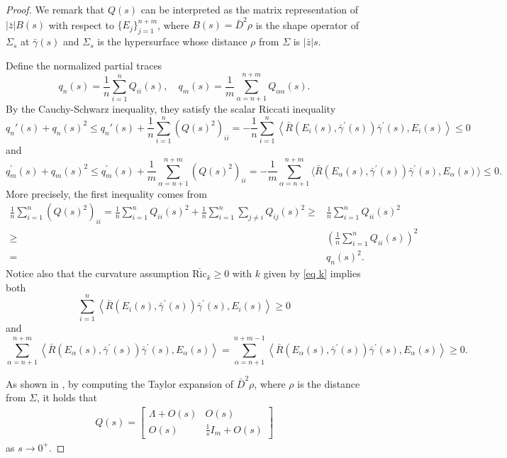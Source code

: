 \documentclass[11pt, reqno]{amsart}
\numberwithin{equation}{section}
\begin{document}
\begin{proof}
We remark that $Q(s)$ can be interpreted as the matrix representation of $|\bar z| B(s)$ with respect to $\{E_j\}_{j=1}^{n+m}$, where $B(s)=\bar D^2 \rho$ is the shape operator of $\Sigma_s$ at $\bar\gamma(s)$ and $\Sigma_s$ is the hypersurface whose distance $\rho$ from $\Sigma$ is $|\bar z|s$.

Define the normalized partial traces
$$
q_n(s)=\frac{1}{n}\sum_{i=1}^n Q_{ii}(s), \quad
q_m(s)=\frac{1}{m}\sum_{\alpha=n+1}^{n+m}Q_{\alpha\alpha}(s).
$$
By the Cauchy-Schwarz inequality, they satisfy the scalar Riccati inequality
$$
q_n'(s)+ q_n(s)^2\le
q_n'(s)+\frac{1}{n}\sum_{i=1}^{n}\left(Q(s)^2\right)_{ii} = -\frac{1}{n}\sum_{i=1}^{n}\left\langle\bar{R}\left(E_i(s), \bar{\gamma}^{\prime}(s)\right) \bar{\gamma}^{\prime}(s), E_i(s)\right\rangle\le0
$$
and
$$
q_m^{\prime}(s)+ q_m(s)^2 \le q_m^{\prime}(s)+\frac{1}{m}\sum_{\alpha =n+1}^{ n+m}(Q(s)^2)_{ii} = -\frac{1}{m}\sum_{\alpha =n+1}^{n+m}\langle
\bar{R}(E_\alpha (s), \bar{\gamma}^{\prime}(s))\bar{\gamma}^{\prime}(s), E_\alpha (s) \rangle \le0.
$$
More precisely, the first inequality comes from
\begin{equation}\label{ineq cs}
\begin{aligned}
\frac{1}{n} \sum_{i=1}^n\left(Q(s)^2\right)_{i i}=\frac{1}{n} \sum_{i=1}^n Q_{i i}(s)^2+\frac{1}{n} \sum_{i=1}^n \sum_{j \ne i} Q_{i j}(s)^2 \ge & \frac{1}{n} \sum_{i=1}^n Q_{i i}(s)^2\\
\ge& \left(\frac{1}{n} \sum_{i=1}^n Q_{i i}(s)\right)^2\\
=& q_n(s)^2.
\end{aligned}
\end{equation}
Notice also that the curvature assumption $\overline{\mathrm{Ric}}_k\ge0$ with $k$ given by \eqref{eq k} implies both
$$\sum_{i=1}^n\left\langle\bar{R}\left(E_i(s), \bar{\gamma}^{\prime}(s)\right) \bar{\gamma}^{\prime}(s), E_i(s)\right\rangle\ge0$$ and
$$\sum_{\alpha=n+1}^{n+m}\left\langle\bar{R}\left(E_\alpha(s), \bar{\gamma}^{\prime}(s)\right) \bar{\gamma}^{\prime}(s), E_\alpha(s)\right\rangle=
\sum_{\alpha=n+1}^{n+m-1}\left\langle\bar{R}\left(E_\alpha(s), \bar{\gamma}^{\prime}(s)\right) \bar{\gamma}^{\prime}(s), E_\alpha(s)\right\rangle\ge0. $$

As shown in \cite[Equation 2.4]{Chahine2019}, by computing the Taylor expansion of $\bar D^2 \rho$, where $\rho$ is the distance from $\Sigma$, it holds that
\begin{align}\label{Q0}
Q(s)=
\begin{bmatrix}
\Lambda+O(s) & O(s)\\
O(s) & \frac{1}{s}I_m+O(s)
\end{bmatrix}
\end{align}
as $s\to0^+$.


\end{proof}
\end{document}
